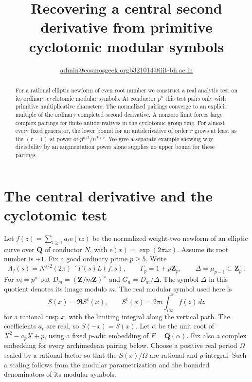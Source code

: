 \documentclass[11pt]{article}
\title{Recovering a central second derivative from primitive cyclotomic modular symbols}
\author{\small \href{mailto:admin@cosmosgeek.org}{admin@cosmosgeek.org}\qquad \href{mailto:b321014@iiit-bh.ac.in}{b321014@iiit-bh.ac.in}}
\date{}
\newcommand{\Z}{\mathbf Z}
\newcommand{\Q}{\mathbf Q}
\newcommand{\ee}{\mathrm e}
\begin{document}
\maketitle

\begin{abstract}
For a rational elliptic newform of even root number we construct a real analytic test on its ordinary cyclotomic modular symbols. At conductor \(p^n\) this test pairs only with primitive multiplicative characters. The normalized pairings converge to an explicit multiple of the ordinary completed second derivative. A nonzero limit forces large complex pairings for finite antiderivatives in the cyclotomic group ring. For almost every fixed generator, the lower bound for an antiderivative of order \(r\) grows at least as the \((r-1)\)-st power of \(p^{n/2}/n^{2+\varepsilon}\). We give a separate example showing why divisibility by an augmentation power alone supplies no upper bound for these pairings.
\end{abstract}

\section{The central derivative and the cyclotomic test}

Let \(f(z)=\sum_{t\ge1}a_t\ee(tz)\) be the normalized weight-two newform of
an elliptic curve over \(\Q\) of conductor \(N\), with
\(\ee(x)=\exp(2\pi i x)\). Assume its root number is \(+1\).
Fix a good ordinary prime \(p\ge5\).
Write
\[
 \Lambda_f(s)=N^{s/2}(2\pi)^{-s}\Gamma(s)L(f,s),\qquad
 \Gamma_p=1+p\Z_p,\qquad \Delta=\mu_{p-1}\subset\Z_p^\times .
\]
For \(m=p^n\) put \(D_m=(\Z/m\Z)^\times\) and \(G_n=D_m/\Delta\).
The symbol \(\Delta\) in this quotient denotes its image modulo \(m\).
The real modular symbol used here is
\[
 S(x)=\Re S^{\mathrm c}(x),\qquad
 S^{\mathrm c}(x)=2\pi i\int_{i\infty}^{x} f(z)\,dz
\]
for a rational cusp \(x\), with the limiting integral along the vertical path.
The coefficients \(a_t\) are real, so \(S(-x)=S(x)\).
Let \(\alpha\) be the unit root of \(X^2-a_pX+p\), using a fixed
\(p\)-adic embedding of \(F=\Q(\alpha)\). Fix also a complex embedding for
every archimedean pairing below. Choose a positive real period
\(\Omega\) scaled by a rational factor so that the \(S(x)/\Omega\) are
rational and \(p\)-integral. Such a scaling follows from the modular
parametrization and the bounded denominators of its modular symbols.
\end{document}
